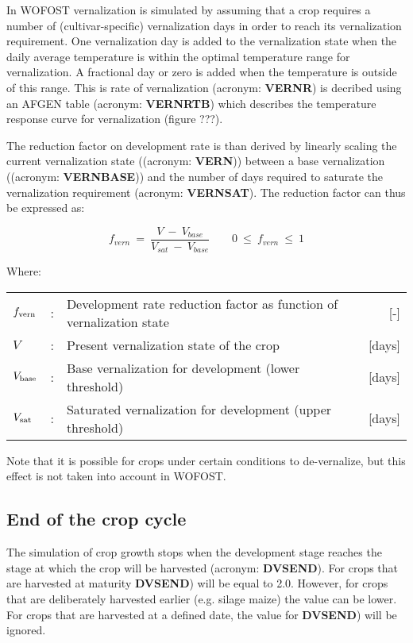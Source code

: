 In WOFOST vernalization is simulated by assuming that a crop requires a number of (cultivar-specific)
vernalization days in order to reach its vernalization requirement. One vernalization day is added to the 
vernalization state 
when the daily average temperature is within the optimal temperature range for vernalization. A fractional
day or zero  is added when the temperature is outside of this range. This is rate of vernalization
(acronym: {\bf VERNR}) is decribed using an AFGEN table (acronym:  {\bf VERNRTB}) which describes the
temperature response curve for vernalization (figure ???).

The reduction factor on development rate is than derived by linearly scaling the current vernalization state 
((acronym:  {\bf VERN}))  between a base vernalization ((acronym:  {\bf VERNBASE})) and the number of 
days required to saturate the vernalization requirement (acronym:  {\bf VERNSAT}). The reduction 
factor can thus be expressed as: 

\begin{equation}
\label{eq:vern_factor}
f_{vern} ~=~{\frac{V ~-~V_{base} }{V _{sat} ~-~ V_{base} }} ~~~~~~~~~0~\le ~f _{vern} ~\le ~1
\end{equation}

Where:\\[5pt]
\begin{tabularx}{\textwidth}{llXr}
	$f_{{\rm vern}}$ &:& Development rate reduction factor as function of vernalization state   &     [-]\\
	$V$ &:& Present vernalization state of the crop   &     [days]\\
	$V_{{\rm base}}$ &:& Base vernalization for development (lower threshold)    &    [days]\\
	$V_{{\rm sat}}$ &:& Saturated vernalization for development (upper threshold)    &    [days]\\
\end{tabularx}

Note that it is possible for crops under certain conditions to de-vernalize, but this effect is not taken
into account in WOFOST.

\subsection{End of the crop cycle}

The simulation of crop growth stops when the development stage reaches the stage at
which the crop will be harvested (acronym: {\bf DVSEND}). For crops that are harvested
at maturity {\bf DVSEND}) will be equal to 2.0. However, for crops that are deliberately
harvested earlier (e.g. silage maize) the value can be lower. For crops that are harvested
at a defined date, the value for {\bf DVSEND}) will be ignored.

